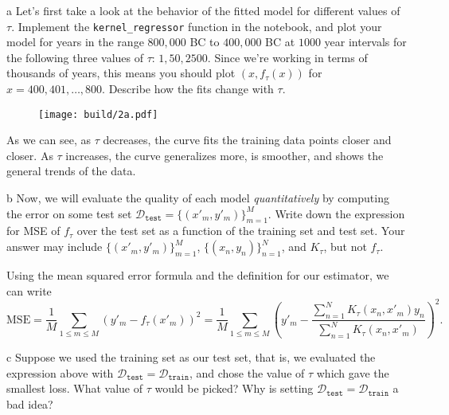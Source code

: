 \documentclass[expanded]{lkx_pset}
\begin{document}
\begin{parts}
	\begin{part}{a}
		Let's first take a look at the behavior of the fitted model for different values of $\tau$. Implement the \texttt{kernel\_regressor} function in the notebook, and plot your model for years in the range $800,000$ BC to $400,000$ BC at $1000$ year intervals for the following three values of $\tau$: $1, 50, 2500$.
		Since we're working in terms of thousands of years, this means you should plot $(x, f_\tau(x))$ for $x = 400, 401, \dots, 800$. Describe how the fits change with $\tau$.
	\end{part}

	\begin{figure}[ht]
		\centering
		\texttt{[image: build/2a.pdf]}
	\end{figure}\noindent
	As we can see, as $\tau$ decreases, the curve fits the training data points closer and closer. As $\tau$ increases, the curve generalizes more, is smoother, and shows the general trends of the data.

	\begin{part}{b}
		Now, we will evaluate the quality of each model \emph{quantitatively} by computing the error on some test set $\mathcal{D}_\texttt{test} = \{(x'_m, y'_m)\}_{m = 1} ^M$.  Write down the expression for MSE of $f_\tau$ over the test set as a function of the training set and test set. Your answer may include $\{(x'_m, y'_m)\}_{m = 1} ^M$, $\{(x_n, y_n)\}_{n = 1} ^N$, and $K_\tau$, but not $f_\tau$.
	\end{part}

	Using the mean squared error formula and the definition for our estimator, we can write
	\[
		\mathrm{MSE} = \frac{1}{M} \sum_{1\leq m \leq M} \left(y'_m - f_\tau(x'_m)\right)^2
		= \frac{1}{M}\sum_{1\leq m \leq M} \left(y'_m - \frac{\sum_{n=1}^N K_\tau(x_n, x'_m)y_n}{\sum_{n=1}^N K_\tau(x_n, x'_m)}\right)^2.
	\]

	\begin{part}{c}
		Suppose we used the training set as our test set, that is, we evaluated the expression above with $\mathcal{D}_\texttt{test} = \mathcal{D}_\texttt{train}$, and chose the value of $\tau$ which gave the smallest loss.  What value of $\tau$ would be picked?  Why is setting $\mathcal{D}_\texttt{test} = \mathcal{D}_\texttt{train}$ a bad idea?
	\end{part}


\end{parts}
\end{document}
